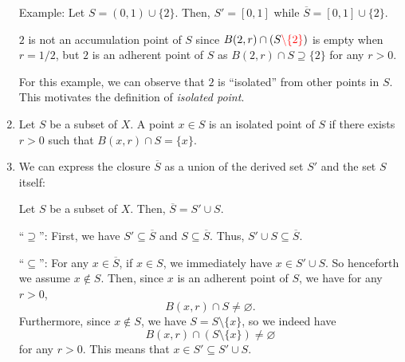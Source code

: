 \begin{enumerate}
Example: Let \(S=(0,1)\cup\{2\}\). Then, \(S'=[0,1]\) while
\(\overline{S}=[0,1]\cup\{2\}\). \begin{note} \(2\) is not an accumulation
point of \(S\) since \(B(2,r)\cap (S{\color{red}\setminus\{2\}})\) is empty
when \(r=1/2\), but \(2\) is an adherent point of \(S\) as \(B(2,r)\cap
S\supseteq \{2\}\) for any \(r>0\).
\end{note} For this example, we can observe that \(2\) is ``isolated'' from
other points in \(S\). This motivates the definition of \emph{isolated point}.

\item Let \(S\) be a subset of \(X\). A point \(x\in S\) is an isolated point
of \(S\) if there exists \(r>0\) such that \(B(x,r)\cap S=\{x\}\).
\begin{center}
\end{center}


\item We can express the closure \(\overline{S}\) as a union of the derived set
\(S'\) and the set \(S\) itself:
\begin{proposition}
\label{prp:clos-union-deriv-s}
Let \(S\) be a subset of \(X\). Then, \(\overline{S}=S'\cup S\).
\end{proposition}
\begin{pf}
``\(\supseteq\)'': First, we have \(S'\subseteq \overline{S}\) and \(S\subseteq
\overline{S}\). Thus, \(S'\cup S\subseteq \overline{S}\).

``\(\subseteq\)'': For any \(x\in\overline{S}\), if \(x\in S\), we immediately
have \(x\in S'\cup S\). So henceforth we assume \(x\notin S\). Then, since
\(x\) is an adherent point of \(S\), we have for any \(r>0\),
\[
B(x,r)\cap S\ne\varnothing.
\]
Furthermore, since \(x\notin S\), we have \(S=S\setminus\{x\}\), so we indeed
have
\[
B(x,r)\cap (S\setminus\{x\})\ne\varnothing
\]
for any \(r>0\). This means that \(x\in S'\subseteq S'\cup S\).
\end{pf}


\end{enumerate}
